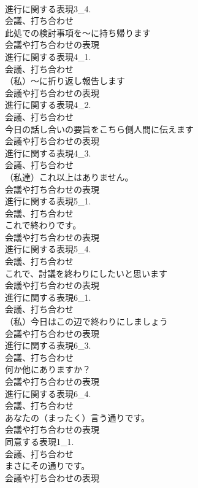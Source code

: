 \documentclass[8pt]{extreport}
\begin{document}
\begin{CJK}{UTF8}{min}
\\	進行に関する表現3_4.
\\	会議、打ち合わせ
\\	此処での検討事項を～に持ち帰ります	
\\	会議や打ち合わせの表現
\\	進行に関する表現4_1.
\\	会議、打ち合わせ
\\	（私）～に折り返し報告します	
\\	会議や打ち合わせの表現
\\	進行に関する表現4_2.
\\	会議、打ち合わせ
\\	今日の話し合いの要旨をこちら側人間に伝えます	
\\	会議や打ち合わせの表現
\\	進行に関する表現4_3.
\\	会議、打ち合わせ
\\	（私達）これ以上はありません。	
\\	会議や打ち合わせの表現
\\	進行に関する表現5_1.
\\	会議、打ち合わせ
\\	これで終わりです。	
\\	会議や打ち合わせの表現
\\	進行に関する表現5_4.
\\	会議、打ち合わせ
\\	これで、討議を終わりにしたいと思います	
\\	会議や打ち合わせの表現
\\	進行に関する表現6_1.
\\	会議、打ち合わせ
\\	（私）今日はこの辺で終わりにしましょう	
\\	会議や打ち合わせの表現
\\	進行に関する表現6_3.
\\	会議、打ち合わせ
\\	何か他にありますか？	
\\	会議や打ち合わせの表現
\\	進行に関する表現6_4.
\\	会議、打ち合わせ
\\	あなたの（まったく）言う通りです。	
\\	会議や打ち合わせの表現
\\	同意する表現1_1.
\\	会議、打ち合わせ
\\	まさにその通りです。	
\\	会議や打ち合わせの表現

\end{CJK}
\end{document}
